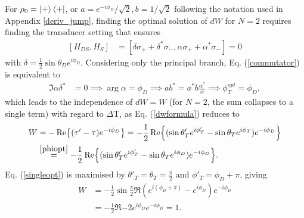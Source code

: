 For $\rho_0 = \ket{+} \bra{+}$, or $a = e^{-i \phi_D}/\sqrt{2}, b = 1/\sqrt{2}$ following the notation used in Appendix \ref{deriv_jump}, finding the optimal solution of $dW$ for $N = 2$ requires finding the transducer setting that ensures
\begin{align}\label{commutator}
	[H_{DS}, H_S] &= [\delta \sigma_{+} + \delta^* \sigma_{-}, \alpha \sigma_{+} + \alpha^* \sigma_{-}] = 0
\end{align}
with $\delta = \frac{1}{2} \sin{\theta_D} e^{i \phi_D}$.
Considering only the principal branch, Eq. (\ref{commutator}) is equivalent to
\begin{align}
	\Im{\alpha \delta^*} &= 0 \implies \arg{\alpha} = \phi_D \implies a b^* = a^* b \frac{\alpha^*}{\alpha} \implies \phi_T^{opt} = \phi_D, \label{phiopt}
\end{align}
which leads to the independence of $dW = W$ (for $N=2$, the sum collapses to a single term) with regard to $\Delta \mathrm{T}$, as Eq. (\ref{dwformula}) reduces to
\begin{align}
	W &= - \Re{(\tau' - \tau) e^{-i\phi_D}} = - \frac{1}{2} \Re{(\sin \theta'_T e^{i\phi'_T} - \sin \theta_T e^{i\phi_T}) e^{-i\phi_D}} \\
	&\overset{\ref{phiopt}}{=} - \frac{1}{2} \Re{(\sin \theta'_T e^{i\phi'_T} - \sin \theta_T e^{i\phi_D}) e^{-i\phi_D}}. \label{singleopt}
\end{align}
Eq. (\ref{singleopt}) is maximised by $\theta'_T = \theta_T = \frac{\pi}{2}$ and $\phi'_T = \phi_D + \pi$, giving
\begin{align}
	W &= - \frac{1}{2} \sin \frac{\pi}{2} \Re{(e^{i(\phi_D + \pi)} - e^{i\phi_D}) e^{-i\phi_D}} \nonumber \\
	&= - \frac{1}{2} \Re{ -2 e^{i\phi_D} e^{-i\phi_D}} = 1.
\end{align}
